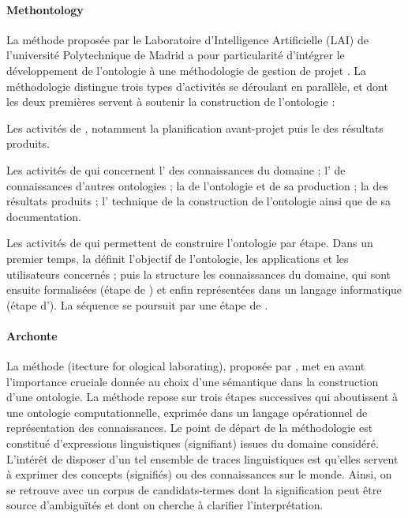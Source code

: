 \paragraph{Methontology}
La méthode proposée par le Laboratoire d'Intelligence Artificielle (LAI) de l'université Polytechnique de Madrid a pour particularité d'intégrer le développement de l'ontologie à une méthodologie de gestion de projet . La méthodologie distingue trois types d'activités se déroulant en parallèle, et dont les deux premières servent à soutenir la construction de l'ontologie :
\begin{liste}
	\item Les activités de , notamment la planification avant-projet puis le  des résultats produits. 
	
	\item Les activités de  qui concernent l' des connaissances du domaine ; l' de connaissances d'autres ontologies ; la  de l'ontologie et de sa production ; la  des résultats produits ; l' technique de la construction de l'ontologie ainsi que de sa documentation. 

	\item Les activités de  qui permettent de construire l'ontologie par étape. 
	Dans un premier temps, la  définit l'objectif de l'ontologie, les applications et les utilisateurs concernés ; puis la  structure les connaissances du domaine, qui sont ensuite formalisées (étape de ) et enfin représentées dans un langage informatique (étape d'). La séquence se poursuit par une étape de .
\end{liste}



\paragraph{Archonte}
La méthode  (itecture for ological laborating), proposée par \cite{Bachimont2000a}, met en avant l'importance cruciale donnée au choix d'une sémantique dans la construction d'une ontologie.
La méthode repose sur trois étapes successives qui aboutissent à une ontologie computationnelle, exprimée dans un langage opérationnel de représentation des connaissances.
Le point de départ de la méthodologie est constitué d'expressions linguistiques (signifiant) issues du domaine considéré.
L'intérêt de disposer d'un tel ensemble de traces linguistiques est qu'elles servent à exprimer des concepts (signifiés) ou des connaissances sur le monde. 
Ainsi, on se retrouve avec un corpus de candidats-termes dont la signification peut être source d'ambiguïtés et dont on cherche à clarifier l'interprétation.\\

